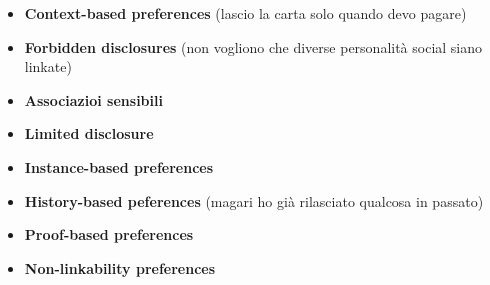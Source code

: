 \documentclass{report}
\begin{document}
\begin{itemize}
    \item \textbf{Context-based preferences} (lascio la carta solo quando devo pagare)
    \item \textbf{Forbidden disclosures} (non vogliono che diverse personalità social siano linkate)
    \item \textbf{Associazioi sensibili}
    \item \textbf{Limited disclosure} 
    \item \textbf{Instance-based preferences}
    \item \textbf{History-based peferences} (magari ho già rilasciato qualcosa in passato)
    \item \textbf{Proof-based preferences}
    \item \textbf{Non-linkability preferences}
\end{itemize}
\end{document}
